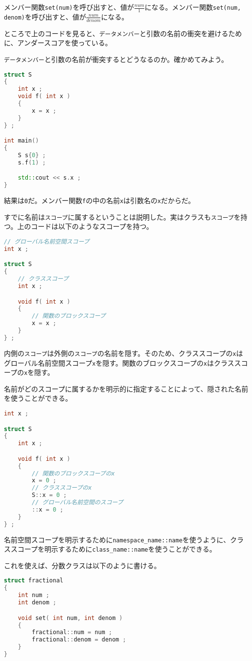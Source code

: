メンバー関数\texttt{set(num)}を呼び出すと、値が\(\frac{num}{1}\)になる。メンバー関数\texttt{set(num, denom)}を呼び出すと、値が\(\frac{num}{denom}\)になる。

ところで上のコードを見ると、\texttt{データメンバー}と引数の名前の衝突を避けるために、アンダースコアを使っている。

\texttt{データメンバー}と引数の名前が衝突するとどうなるのか。確かめてみよう。

\begin{lstlisting}[language={C++}]
struct S
{
    int x ;
    void f( int x )
    {
        x = x ;
    }
} ;

int main()
{
    S s{0} ;
    s.f(1) ;

    std::cout << s.x ;
}
\end{lstlisting}

結果は\texttt{0}だ。メンバー関数\texttt{f}の中の名前\texttt{x}は引数名の\texttt{x}だからだ。

すでに名前は\texttt{スコープ}に属するということは説明した。実はクラスも\texttt{スコープ}を持つ。上のコードは以下のようなスコープを持つ。

\begin{lstlisting}[language={C++}]
// グローバル名前空間スコープ
int x ;

struct S
{
    // クラススコープ
    int x ;

    void f( int x )
    {
        // 関数のブロックスコープ
        x = x ;
    }
} ;
\end{lstlisting}

内側の\texttt{スコープ}は外側の\texttt{スコープ}の名前を隠す。そのため、クラススコープの\texttt{x}はグローバル名前空間スコープ\texttt{x}を隠す。関数のブロックスコープの\texttt{x}はクラススコープの\texttt{x}を隠す。

名前がどのスコープに属するかを明示的に指定することによって、隠された名前を使うことができる。

\begin{lstlisting}[language={C++}]
int x ;

struct S
{
    int x ;

    void f( int x )
    {
        // 関数のブロックスコープのx
        x = 0 ;
        // クラススコープのx
        S::x = 0 ;
        // グローバル名前空間のスコープ
        ::x = 0 ;
    }
} ;
\end{lstlisting}

名前空間スコープを明示するために\texttt{namespace\_name::name}を使うように、クラススコープを明示するために\texttt{class\_name::name}を使うことができる。

\ifTombow\pagebreak\fi
これを使えば、分数クラスは以下のように書ける。

\begin{lstlisting}[language={C++}]
struct fractional
{
    int num ;
    int denom ;

    void set( int num, int denom )
    {
        fractional::num = num ;
        fractional::denom = denom ;
    }
}
\end{lstlisting}

